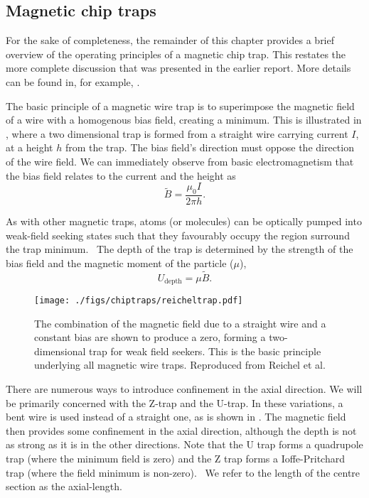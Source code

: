 \subsection*{Magnetic chip traps}

For the sake of completeness, the remainder of this chapter provides a brief
overview of the operating principles of a magnetic chip trap. This restates the
more complete discussion that was presented in the earlier report. More details
can be found in, for example, .

The basic principle of a magnetic wire trap is to superimpose the magnetic
field of a wire with a homogenous bias field, creating a minimum. This is
illustrated in , where a two dimensional
trap is formed from a straight wire carrying current $I$, at a height $h$ from
the trap. 
The bias field's direction must oppose the
direction of the wire field. We can immediately observe from basic
electromagnetism that the bias field relates to the current and the height
as~\cite{Reichel1999}
%
\begin{equation}
  \tilde{B} = \frac{\mu_0 I}{2\pi h}.
  \label{into:eq:trapbias}
\end{equation}

As with other magnetic traps, atoms (or molecules) can be optically pumped into
weak-field seeking states such that they favourably occupy the region surround
the trap minimum.~\cite{Metcalf1999} The depth of the trap is determined by the
strength of the bias field and the magnetic moment of the particle ($\mu$),
%
\begin{equation}
  U_\text{depth} = \mu \tilde{B}. 
  \label{intro:eq:trapdepth}
\end{equation}

\begin{figure}
  \centering
  \texttt{[image: ./figs/chiptraps/reicheltrap.pdf]}
  \caption{The combination of the magnetic field due to a straight wire and a
  constant bias are shown to produce a zero, forming a two-dimensional trap for
  weak field seekers. This is the basic principle underlying all magnetic wire
  traps. Reproduced from Reichel et al.~\cite{Reichel1999}
  }
  \label{intro:fig:reicheltrap}
\end{figure}

There are numerous ways to introduce confinement in the axial direction. We
will be primarily concerned with the Z-trap and the U-trap. In these variations,
a bent wire is used instead of a straight one, as is shown in
. The magnetic field then provides some confinement in the
axial direction, although the depth is not as strong as it is in the other
directions. Note that the U trap forms a quadrupole trap (where the minimum
field is zero) and the Z trap forms a Ioffe-Pritchard trap (where the field
minimum is non-zero).~\cite{2011Ac} We refer to the length of the centre section as
the axial-length.


